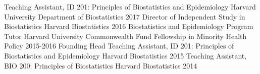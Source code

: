

\begin{cvinvolves}
	\cvinvolve
	{Teaching Assistant, ID 201: Principles of Biostatistics and Epidemiology} %
	{Harvard University Department of Biostatistics} %
	{} %
	{2017} %
\cvinvolve
{Director of Independent Study in Biostatistics} %
{Harvard Biostatistics} %
{} %
{2016} %
\cvinvolve
{Biostatistics and Epidemiology Program Tutor} %
{Harvard University Commonwealth Fund Fellowship in Minority Health Policy} %
{} %
{2015-2016} %
\cvinvolve
{Founding Head Teaching Assistant, ID 201: Principles of Biostatistics and Epidemiology} %
{Harvard  Biostatistics} %
{} %
{2015} %
\cvinvolve
{Teaching Assistant, BIO 200: Principles of Biostatistics} %
{Harvard  Biostatistics} %
{} %
{2014} %
	
\end{cvinvolves}

